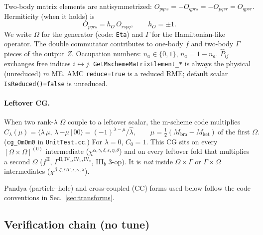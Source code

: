 \documentclass[enabledeprecatedfontcommands]{scrartcl}
\newcommand{\codename}[1]{\texttt{#1}}
\newcommand{\CGleftover}{\langle\lambda\,\mu,\,\lambda\,{-\mu}\,|\,00\rangle}
\begin{document}
Two-body matrix elements are antisymmetrized:
$O_{pqrs}=-O_{qprs}=-O_{pqsr}=O_{qpsr}$.
Hermiticity (when it holds) is
\begin{equation}
  O_{pqrs}=h_O\,O_{rspq},\qquad h_O=\pm 1.
\end{equation}
We write $\Omega$ for the generator (code: \codename{Eta}) and $\Gamma$ for
the Hamiltonian-like operator.
The double commutator contributes to one-body $f$ and two-body $\Gamma$ pieces
of the output $Z$.
Occupation numbers: $n_a\in\{0,1\}$, $\bar n_a=1-n_a$.
$\hat P_{ij}$ exchanges free indices $i\leftrightarrow j$.
\codename{GetMschemeMatrixElement\_*} is always the physical (unreduced) $m$
ME. AMC \codename{reduce=true} is a reduced RME; default scalar
\codename{IsReduced()=false} is unreduced.

\paragraph{Leftover CG.}
When two rank-$\lambda$ $\Omega$ couple to a leftover scalar, the m-scheme
code multiplies
\begin{equation}\label{eq:cg-leftover}
  C_\lambda(\mu)
  =\CGleftover
  =(-1)^{\lambda-\mu}/\hat\lambda,
  \qquad
  \mu=\tfrac12(M_{\mathrm{bra}}-M_{\mathrm{ket}})\ \text{of the first $\Omega$}.
\end{equation}
(\codename{cg\_OmOm0} in \codename{UnitTest.cc}.) For $\lambda=0$, $C_0=1$.
This CG sits on every $[\Omega\times\Omega]^{(0)}$ intermediate
($\chi^{\alpha,\gamma,\delta,\varepsilon,\eta,\theta}$) and on every leftover
fold that multiplies a second $\Omega$
($f^{\mathrm{II}}$, $\Gamma^{\mathrm{II,IV_a,IV_b,IV_c}}$, III$_b$ 3-op).
It is \emph{not} inside $\Omega\times\Gamma$ or $\Gamma\times\Omega$
intermediates ($\chi^{\beta,\zeta,\Omega\Gamma,\iota,\kappa,\lambda}$).

Pandya (particle--hole) and cross-coupled (CC) forms used below follow the
code conventions in Sec.~\ref{sec:transforms}.

\subsection{Verification chain (no tune)}
\label{sec:verify-chain}
\end{document}
